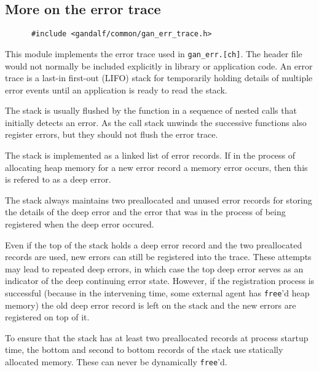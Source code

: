 \subsection{More on the error trace}
\begin{verbatim}
      #include <gandalf/common/gan_err_trace.h>
\end{verbatim}
This module implements the error trace used in {\tt gan\_err.[ch]}.
The header file would not normally be included explicitly in library or
application code. An error trace is a last-in first-out (LIFO) stack for
temporarily holding details of multiple error events
until an application is ready to read the stack.

The stack is usually flushed by the function in a
sequence of nested calls that initially detects an
error. As the call stack unwinds the successive
functions also register errors, but they should not
flush the error trace.

The stack is implemented as a linked list of error
records. If in the process of allocating heap memory
for a new error record a memory error occurs, then
this is refered to as a deep error.

The stack always maintains two preallocated and unused
error records for storing the details of the deep
error and the error that was in the process of being
registered when the deep error occured.

Even if the top of the stack holds a deep error record
and the two preallocated records are used, new errors
can still be registered into the trace. These attempts
may lead to repeated deep errors, in which case the
top deep error serves as an indicator of the deep
continuing error state. However, if the registration
process is successful (because in the intervening
time, some external agent has {\tt free}'d heap memory) the
old deep error record is left on the stack and the new
errors are registered on top of it.

To ensure that the stack has at least two preallocated
records at process startup time, the bottom and second
to bottom records of the stack use statically
allocated memory. These can never be dynamically {\tt free}'d.


